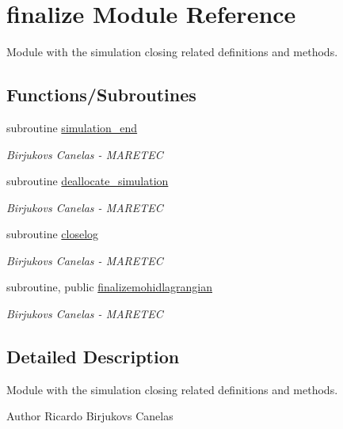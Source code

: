 \hypertarget{namespacefinalize}{}\section{finalize Module Reference}
\label{namespacefinalize}


Module with the simulation closing related definitions and methods.  


\subsection*{Functions/\+Subroutines}
\begin{DoxyCompactItemize}
\item 
subroutine \hyperlink{namespacefinalize_a57fbc96712f416103b529ff969479250}{simulation\+\_\+end}
\begin{DoxyCompactList}\small\item\em Birjukovs Canelas -\/ M\+A\+R\+E\+T\+EC \end{DoxyCompactList}\item 
subroutine \hyperlink{namespacefinalize_a2b6733e6db5a768ac96ad9274685ad43}{deallocate\+\_\+simulation}
\begin{DoxyCompactList}\small\item\em Birjukovs Canelas -\/ M\+A\+R\+E\+T\+EC \end{DoxyCompactList}\item 
subroutine \hyperlink{namespacefinalize_ac448631d05fe5daa8739f32c95e89152}{closelog}
\begin{DoxyCompactList}\small\item\em Birjukovs Canelas -\/ M\+A\+R\+E\+T\+EC \end{DoxyCompactList}\item 
subroutine, public \hyperlink{namespacefinalize_a57aceaa0eb3b16c1942dd2cb013010e4}{finalizemohidlagrangian}
\begin{DoxyCompactList}\small\item\em Birjukovs Canelas -\/ M\+A\+R\+E\+T\+EC \end{DoxyCompactList}\end{DoxyCompactItemize}


\subsection{Detailed Description}
Module with the simulation closing related definitions and methods. 

\begin{DoxyAuthor}{Author}
Ricardo Birjukovs Canelas 
\end{DoxyAuthor}



